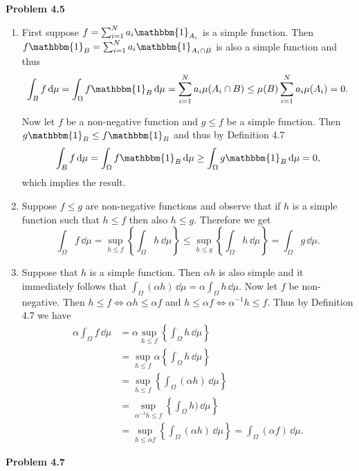 \textbf{Problem 4.5}
\begin{enumerate}[label={(\alph*)}]
\item First suppose $f = \sum_{i = 1}^N a_i \mathbbm{1}_{A_i}$ is a simple function. Then $f \mathbbm{1}_B = \sum_{i = 1}^N a_i \mathbbm{1}_{A_i \cap B}$ is also a simple function and thus
\[
	\int_B f \, \dd \mu = \int_\Omega f \mathbbm{1}_B \, \dd \mu = \sum_{i = 1}^N a_i \mu(A_i \cap B) \le \mu(B) \sum_{i = 1}^N a_i \mu(A_i) = 0.
\]

Now let $f$ be a non-negative function and $g \le f$ be a simple function. Then $g \mathbbm{1}_B \le f \mathbbm{1}_B$ and thus by Definition 4.7
\begin{align*}
	\int_B f \, \dd \mu = \int_\Omega f \mathbbm{1}_B \, \dd \mu \ge \int_\Omega g \mathbbm{1}_B \, \dd \mu = 0,
\end{align*}
which implies the result.

\item Suppose $f \le g$ are non-negative functions and observe that if $h$ is a simple function such that $h \le f$ then also $h \le g$. Therefore we get
\[
	\int_\Omega f \, \dd \mu = \sup_{h \le f}\left\{\int_\Omega h \, \dd \mu\right\}
	\le \sup_{h \le g}\left\{\int_\Omega h \, \dd \mu\right\} = \int_\Omega g \, \dd \mu.
\]
\item Suppose that $h$ is a simple function. Then $\alpha h$ is also simple and it immediately follows that $\int_\Omega (\alpha h) \, \dd \mu = \alpha \int_\Omega h \, \dd \mu$. Now let $f$ be non-negative. Then $h \le f \iff \alpha h \le \alpha f$ and $h \le \alpha f \iff \alpha^{-1} h \le f$. Thus by Definition 4.7 we have
\begin{align*}
	\alpha \int_\Omega f \, \dd \mu &= \alpha \sup_{h \le f}\left\{\int_\Omega h \, \dd \mu\right\}\\
	&= \sup_{h \le f} \alpha \left\{\int_\Omega  h \, \dd \mu\right\}\\
	&= \sup_{h \le f} \left\{\int_\Omega (\alpha h) \, \dd \mu\right\}\\
	&= \sup_{\alpha^{-1} h \le f} \left\{\int_\Omega h) \, \dd \mu\right\}\\
	&= \sup_{h \le \alpha f} \left\{\int_\Omega (\alpha h) \, \dd \mu\right\} = \int_\Omega (\alpha f) \, \dd \mu.
\end{align*}
\end{enumerate}

\bigskip

\textbf{Problem 4.7}

